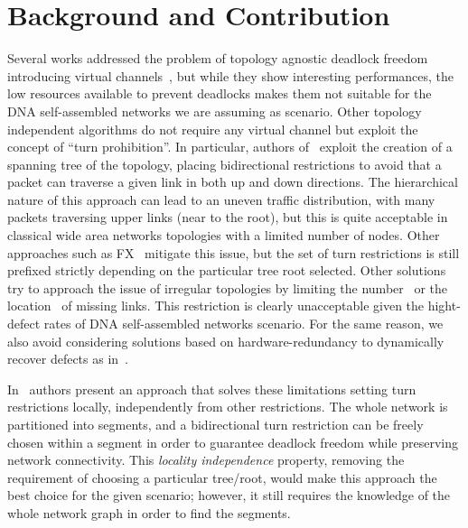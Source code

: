 \section{Background and Contribution}
\label{sec:related_works}
Several works addressed the problem of topology agnostic deadlock
freedom introducing virtual channels~\cite{Abbas2014, skeie2004, koibuchi2003}, but while they show interesting
performances, the low resources available to prevent deadlocks makes them not suitable for
the DNA self-assembled networks we are assuming as
scenario.
Other topology independent algorithms do not require any virtual channel but
exploit the concept of ``turn prohibition''.
In particular, authors of~\cite{Patwardhan05evaluatingthe} exploit the creation of a spanning tree of the
topology, placing bidirectional restrictions to avoid that a packet
can traverse a given link in both up and down directions.
The hierarchical nature of this approach can lead to an uneven traffic
distribution, with many packets traversing upper links (near to the
root), but this is quite acceptable in classical wide area networks
topologies with a limited number of nodes. Other approaches such as
FX~\cite{sancho2000} mitigate this
issue, but the set of turn restrictions is still prefixed
strictly depending on the particular tree root selected. 
Other solutions try to approach the issue of irregular
topologies by limiting the number~\cite{ gomez2004, koibuchi2008} or the
location~\cite{flich2008, liu2011} of missing links. This
restriction is clearly unacceptable given the hight-defect rates of
DNA self-assembled networks scenario. For the same reason, we also
avoid considering solutions based on hardware-redundancy to
dynamically recover defects as in~\cite{ebrahimi2013}. 

In~\cite{mejia_ipdps06} authors present an approach that solves these
limitations setting turn restrictions locally,
independently from other restrictions. The whole network is
partitioned into segments, and a bidirectional turn
restriction can be freely chosen within a segment in order to guarantee
deadlock freedom while preserving network connectivity. This \emph{locality
independence} property, removing the requirement of choosing a particular tree/root,
would make this approach the best choice for the given scenario;
however, it still requires the knowledge of the
whole network graph in order to find the segments.

